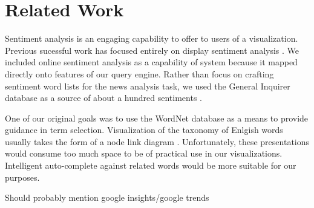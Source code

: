\section{Related Work}

\cite{grobelnik2004visualization}
\cite{collins2006wordnet}
\cite{collins2009docuburst}
\cite{wermter2002selforganizing}
\cite{johnson2004network}
\cite{hearst1995tilebars}
\cite{mehler2006spatial}
\cite{paulovich2006text}



Sentiment analysis is an engaging capability to offer to users of a visualization.  Previous sucessful work has focused entirely on display sentiment analysis \cite{wanner2009visual}.  We included online sentiment analysis as a capability of system because it mapped directly onto features of our query engine.  Rather than focus on crafting sentiment word lists for the news analysis task, we used the General Inquirer database as a source of about a hundred sentiments \cite{generalinquirer}.

One of our original goals was to use the WordNet database as a means to provide guidance in term selection.  Visualization of the taxonomy of Enlgish words usually takes the form of a node link diagram \cite{dakka2008automatic,wordvis}.  Unfortunately, these presentations would consume too much space to be of practical use in our visualizations.  Intelligent auto-complete against related words would be more suitable for our purposes.


Should probably mention google insights/google trends